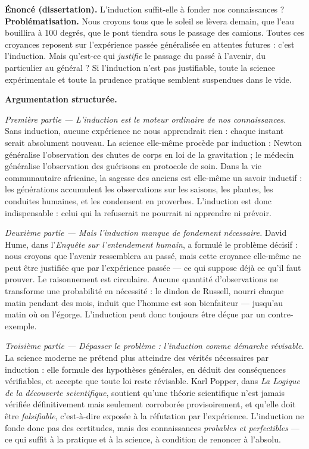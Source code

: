 \documentclass[11pt]{article}
\begin{document}
\begin{exoresolu}
\textbf{Énoncé (dissertation).} L'induction suffit-elle à fonder nos connaissances ?
\tcblower
\textbf{Problématisation.} Nous croyons tous que le soleil se lèvera demain, que l'eau bouillira à 100 degrés, que le pont tiendra sous le passage des camions. Toutes ces croyances reposent sur l'expérience passée généralisée en attentes futures : c'est l'induction. Mais qu'est-ce qui \emph{justifie} le passage du passé à l'avenir, du particulier au général ? Si l'induction n'est pas justifiable, toute la science expérimentale et toute la prudence pratique semblent suspendues dans le vide.

\textbf{Argumentation structurée.}

\emph{Première partie — L'induction est le moteur ordinaire de nos connaissances.} Sans induction, aucune expérience ne nous apprendrait rien : chaque instant serait absolument nouveau. La science elle-même procède par induction : Newton généralise l'observation des chutes de corps en loi de la gravitation ; le médecin généralise l'observation des guérisons en protocole de soin. Dans la vie communautaire africaine, la sagesse des anciens est elle-même un savoir inductif : les générations accumulent les observations sur les saisons, les plantes, les conduites humaines, et les condensent en proverbes. L'induction est donc indispensable : celui qui la refuserait ne pourrait ni apprendre ni prévoir.

\emph{Deuxième partie — Mais l'induction manque de fondement nécessaire.} David Hume, dans l'\emph{Enquête sur l'entendement humain}, a formulé le problème décisif : nous croyons que l'avenir ressemblera au passé, mais cette croyance elle-même ne peut être justifiée que par l'expérience passée — ce qui suppose déjà ce qu'il faut prouver. Le raisonnement est circulaire. Aucune quantité d'observations ne transforme une probabilité en nécessité : le dindon de Russell, nourri chaque matin pendant des mois, induit que l'homme est son bienfaiteur — jusqu'au matin où on l'égorge. L'induction peut donc toujours être déçue par un contre-exemple.

\emph{Troisième partie — Dépasser le problème : l'induction comme démarche révisable.} La science moderne ne prétend plus atteindre des vérités nécessaires par induction : elle formule des hypothèses générales, en déduit des conséquences vérifiables, et accepte que toute loi reste révisable. Karl Popper, dans \emph{La Logique de la découverte scientifique}, soutient qu'une théorie scientifique n'est jamais vérifiée définitivement mais seulement corroborée provisoirement, et qu'elle doit être \emph{falsifiable}, c'est-à-dire exposée à la réfutation par l'expérience. L'induction ne fonde donc pas des certitudes, mais des connaissances \emph{probables et perfectibles} — ce qui suffit à la pratique et à la science, à condition de renoncer à l'absolu.


\end{exoresolu}
\end{document}
